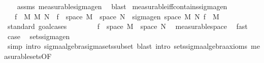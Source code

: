 \begin{isabellebody}
%
\isadelimproof
\ \ %
\endisadelimproof
%
\isatagproof
{}\isamarkupfalse%
\ assms\ measurable{\isacharunderscore}{\kern0pt}sigma{\isacharunderscore}{\kern0pt}gen\ \isamarkupfalse%
\ blast%
\endisatagproof
{\isafoldproof}%
%
\isadelimproof
\isanewline
%
\endisadelimproof
\isanewline
{}\isamarkupfalse%
\ measurable{\isacharunderscore}{\kern0pt}iff{\isacharunderscore}{\kern0pt}contains{\isacharunderscore}{\kern0pt}sigma{\isacharunderscore}{\kern0pt}gen{\isacharcolon}{\kern0pt}\isanewline
\ \ \ {\isachardoublequoteopen}{\isacharparenleft}{\kern0pt}f\ {\isasymin}\ M\ {\isasymrightarrow}\isactrlsub M\ N{\isacharparenright}{\kern0pt}\ {\isasymlongleftrightarrow}\ f\ {\isasymin}\ space\ M\ {\isasymrightarrow}\ space\ N\ {\isasymand}\ sigma{\isacharunderscore}{\kern0pt}gen\ {\isacharparenleft}{\kern0pt}space\ M{\isacharparenright}{\kern0pt}\ N\ {\isacharbraceleft}{\kern0pt}f{\isacharbraceright}{\kern0pt}\ {\isasymsubseteq}\ M{\isachardoublequoteclose}\isanewline
%
\isadelimproof
%
\endisadelimproof
%
\isatagproof
{}\isamarkupfalse%
\ {\isacharparenleft}{\kern0pt}standard{\isacharcomma}{\kern0pt}\ goal{\isacharunderscore}{\kern0pt}cases{\isacharparenright}{\kern0pt}\isanewline
\ \ \isamarkupfalse%
\ {}\isanewline
\ \ \isamarkupfalse%
\ {\isachardoublequoteopen}f\ {\isasymin}\ space\ M\ {\isasymrightarrow}\ space\ N{\isachardoublequoteclose}\ \isamarkupfalse%
\ measurable{\isacharunderscore}{\kern0pt}space\ \isamarkupfalse%
\ fast\isanewline
\ \ \isamarkupfalse%
\ {\isacharquery}{\kern0pt}case\ \isamarkupfalse%
\ sets{\isacharunderscore}{\kern0pt}sigma{\isacharunderscore}{\kern0pt}gen\ \isamarkupfalse%
\ {\isacharparenleft}{\kern0pt}simp{\isacharcomma}{\kern0pt}\ intro\ sigma{\isacharunderscore}{\kern0pt}algebra{\isachardot}{\kern0pt}sigma{\isacharunderscore}{\kern0pt}sets{\isacharunderscore}{\kern0pt}subset{\isacharcomma}{\kern0pt}\ {\isacharparenleft}{\kern0pt}blast\ intro{\isacharcolon}{\kern0pt}\ sets{\isachardot}{\kern0pt}sigma{\isacharunderscore}{\kern0pt}algebra{\isacharunderscore}{\kern0pt}axioms\ measurable{\isacharunderscore}{\kern0pt}sets{\isacharbrackleft}{\kern0pt}OF\ {}{\isacharbrackright}{\kern0pt}{\isacharparenright}{\kern0pt}{\isacharplus}{\kern0pt}{\isacharparenright}{\kern0pt}\ \isanewline
{}\isamarkupfalse%
\isanewline
\ \ \isamarkupfalse%
\ {}\isanewline
\ \ \isamarkupfalse%

\end{isabellebody}
